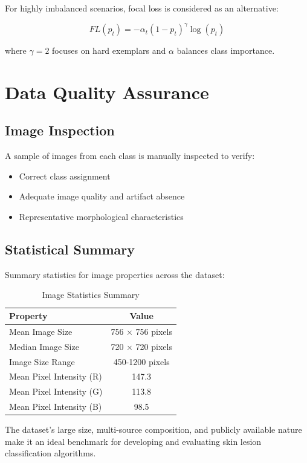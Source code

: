 For highly imbalanced scenarios, focal loss is considered as an alternative:

\begin{equation}
FL(p_t) = -\alpha_t(1-p_t)^{\gamma}\log(p_t)
\end{equation}

where $\gamma = 2$ focuses on hard exemplars and $\alpha$ balances class importance.

\section{Data Quality Assurance}

\subsection{Image Inspection}

A sample of images from each class is manually inspected to verify:

\begin{itemize}
    \item Correct class assignment
    \item Adequate image quality and artifact absence
    \item Representative morphological characteristics
\end{itemize}

\subsection{Statistical Summary}

Summary statistics for image properties across the dataset:

\begin{table}[H]
\centering
\caption{Image Statistics Summary}
\label{tab:image_stats}
\begin{tabular}{|l|c|}
\hline
\textbf{Property} & \textbf{Value} \\
\hline
Mean Image Size & 756 × 756 pixels \\
Median Image Size & 720 × 720 pixels \\
Image Size Range & 450-1200 pixels \\
Mean Pixel Intensity (R) & 147.3 \\
Mean Pixel Intensity (G) & 113.8 \\
Mean Pixel Intensity (B) & 98.5 \\
\hline
\end{tabular}
\end{table}

The dataset's large size, multi-source composition, and publicly available nature make it an ideal benchmark for developing and evaluating skin lesion classification algorithms.
